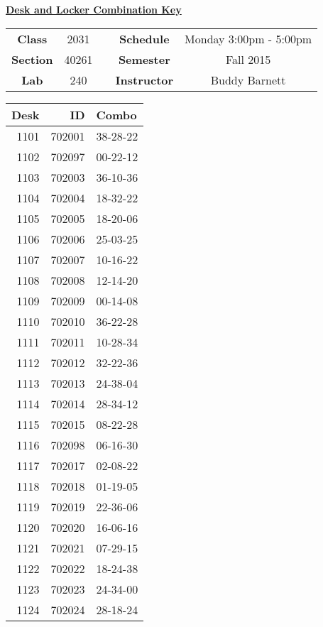 \documentclass[12pt]{article}
\begin{document}
\thispagestyle{empty}

\begin{center}
	{\huge\textbf{\underline{ Desk and Locker Combination Key}}}
\end{center}


\begin{table}[h]
  \centering
  \begin{tabular}{ccccc}

  \textbf{Class} & 2031 & {\qquad} &\textbf{Schedule} & Monday 3:00pm - 5:00pm \\
  \textbf{Section} & 40261 & {\qquad} & \textbf{Semester} & Fall 2015 \\
  \textbf{Lab} & 240 & {\qquad} & \textbf{Instructor} & Buddy Barnett \\
  \end{tabular}
\end{table}
 \vspace{0.1in}
\begin{minipage}{0.4\textwidth}

\begin{tabular}{rrl}
\toprule
 Desk &      ID &     Combo \\
\midrule
 1101 &  702001 &  38-28-22 \\
 1102 &  702097 &  00-22-12 \\
 1103 &  702003 &  36-10-36 \\
 1104 &  702004 &  18-32-22 \\
 1105 &  702005 &  18-20-06 \\
 1106 &  702006 &  25-03-25 \\
 1107 &  702007 &  10-16-22 \\
 1108 &  702008 &  12-14-20 \\
 1109 &  702009 &  00-14-08 \\
 1110 &  702010 &  36-22-28 \\
 1111 &  702011 &  10-28-34 \\
 1112 &  702012 &  32-22-36 \\
 1113 &  702013 &  24-38-04 \\
 1114 &  702014 &  28-34-12 \\
 1115 &  702015 &  08-22-28 \\
 1116 &  702098 &  06-16-30 \\
 1117 &  702017 &  02-08-22 \\
 1118 &  702018 &  01-19-05 \\
 1119 &  702019 &  22-36-06 \\
 1120 &  702020 &  16-06-16 \\
 1121 &  702021 &  07-29-15 \\
 1122 &  702022 &  18-24-38 \\
 1123 &  702023 &  24-34-00 \\
 1124 &  702024 &  28-18-24 \\
\bottomrule
\end{tabular}


\end{minipage}
\end{document}
